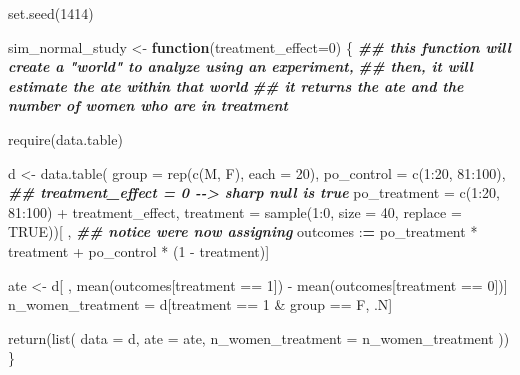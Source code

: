 \documentclass[
]{article}
\newenvironment{Shaded}{\begin{snugshade}}{\end{snugshade}}
\newcommand{\AttributeTok}[1]{\textcolor[rgb]{0.77,0.63,0.00}{#1}}
\newcommand{\ConstantTok}[1]{\textcolor[rgb]{0.00,0.00,0.00}{#1}}
\newcommand{\ControlFlowTok}[1]{\textcolor[rgb]{0.13,0.29,0.53}{\textbf{#1}}}
\newcommand{\DecValTok}[1]{\textcolor[rgb]{0.00,0.00,0.81}{#1}}
\newcommand{\DocumentationTok}[1]{\textcolor[rgb]{0.56,0.35,0.01}{\textbf{\textit{#1}}}}
\newcommand{\ErrorTok}[1]{\textcolor[rgb]{0.64,0.00,0.00}{\textbf{#1}}}
\newcommand{\FunctionTok}[1]{\textcolor[rgb]{0.00,0.00,0.00}{#1}}
\newcommand{\NormalTok}[1]{#1}
\newcommand{\OtherTok}[1]{\textcolor[rgb]{0.56,0.35,0.01}{#1}}
\newcommand{\SpecialCharTok}[1]{\textcolor[rgb]{0.00,0.00,0.00}{#1}}
\newcommand{\StringTok}[1]{\textcolor[rgb]{0.31,0.60,0.02}{#1}}
\begin{document}
\begin{Shaded}
\begin{Highlighting}[]
\FunctionTok{set.seed}\NormalTok{(}\DecValTok{1414}\NormalTok{)}

\NormalTok{sim\_normal\_study }\OtherTok{\textless{}{-}} \ControlFlowTok{function}\NormalTok{(}\AttributeTok{treatment\_effect=}\DecValTok{0}\NormalTok{) \{}
  \DocumentationTok{\#\# this function will create a "world" to analyze using an experiment, }
  \DocumentationTok{\#\# then, it will estimate the ate within that world }
  \DocumentationTok{\#\# it returns the ate and the number of women who are in treatment }
  
  \FunctionTok{require}\NormalTok{(data.table)}
  
\NormalTok{  d }\OtherTok{\textless{}{-}} \FunctionTok{data.table}\NormalTok{(}
      \AttributeTok{group        =} \FunctionTok{rep}\NormalTok{(}\FunctionTok{c}\NormalTok{(}\StringTok{\textquotesingle{}M\textquotesingle{}}\NormalTok{, }\StringTok{\textquotesingle{}F\textquotesingle{}}\NormalTok{), }\AttributeTok{each =} \DecValTok{20}\NormalTok{), }
      \AttributeTok{po\_control   =} \FunctionTok{c}\NormalTok{(}\DecValTok{1}\SpecialCharTok{:}\DecValTok{20}\NormalTok{, }\DecValTok{81}\SpecialCharTok{:}\DecValTok{100}\NormalTok{), }
        \DocumentationTok{\#\# treatment\_effect = 0 {-}{-}\textgreater{} sharp null is true}
      \AttributeTok{po\_treatment =} \FunctionTok{c}\NormalTok{(}\DecValTok{1}\SpecialCharTok{:}\DecValTok{20}\NormalTok{, }\DecValTok{81}\SpecialCharTok{:}\DecValTok{100}\NormalTok{) }\SpecialCharTok{+}\NormalTok{ treatment\_effect, }
      \AttributeTok{treatment =} \FunctionTok{sample}\NormalTok{(}\DecValTok{1}\SpecialCharTok{:}\DecValTok{0}\NormalTok{, }\AttributeTok{size =} \DecValTok{40}\NormalTok{, }\AttributeTok{replace =} \ConstantTok{TRUE}\NormalTok{))[ , }\DocumentationTok{\#\# notice we\textquotesingle{}re now assigning}
\NormalTok{      outcomes }\SpecialCharTok{:}\ErrorTok{=}\NormalTok{ po\_treatment }\SpecialCharTok{*}\NormalTok{ treatment }\SpecialCharTok{+}\NormalTok{ po\_control }\SpecialCharTok{*}\NormalTok{ (}\DecValTok{1} \SpecialCharTok{{-}}\NormalTok{ treatment)]}

\NormalTok{  ate }\OtherTok{\textless{}{-}}\NormalTok{ d[ , }\FunctionTok{mean}\NormalTok{(outcomes[treatment }\SpecialCharTok{==} \DecValTok{1}\NormalTok{]) }\SpecialCharTok{{-}} \FunctionTok{mean}\NormalTok{(outcomes[treatment }\SpecialCharTok{==} \DecValTok{0}\NormalTok{])]}
\NormalTok{  n\_women\_treatment }\OtherTok{=}\NormalTok{ d[treatment }\SpecialCharTok{==} \DecValTok{1} \SpecialCharTok{\&}\NormalTok{ group }\SpecialCharTok{==} \StringTok{\textquotesingle{}F\textquotesingle{}}\NormalTok{, .N]}

  \FunctionTok{return}\NormalTok{(}\FunctionTok{list}\NormalTok{(}
    \AttributeTok{data =}\NormalTok{ d,}
    \AttributeTok{ate =}\NormalTok{ ate, }
    \AttributeTok{n\_women\_treatment =}\NormalTok{ n\_women\_treatment}
\NormalTok{    ))}
\NormalTok{\}}
\end{Highlighting}
\end{Shaded}
\end{document}
